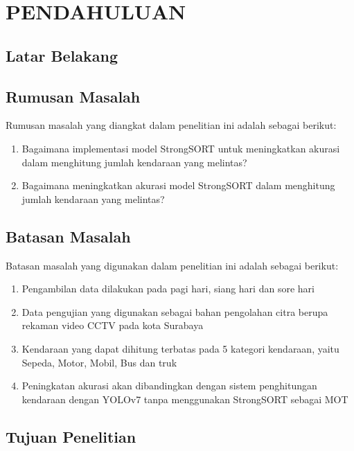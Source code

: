 \chapter{PENDAHULUAN}
\section{Latar Belakang}

\lipsum[2-4]

\section{Rumusan Masalah}

Rumusan masalah yang diangkat dalam penelitian ini adalah sebagai berikut: 
\begin{enumerate}
  \item Bagaimana implementasi model StrongSORT untuk meningkatkan akurasi dalam menghitung jumlah kendaraan yang melintas?
  \item Bagaimana meningkatkan akurasi model StrongSORT dalam menghitung jumlah kendaraan yang melintas?
\end{enumerate}

\section{Batasan Masalah}

Batasan masalah yang digunakan dalam penelitian ini adalah sebagai berikut: \begin{enumerate}
  \item Pengambilan data dilakukan pada pagi hari, siang hari dan sore hari
  \item Data pengujian yang digunakan sebagai bahan pengolahan citra berupa rekaman video CCTV pada kota Surabaya
  \item Kendaraan yang dapat dihitung terbatas pada 5 kategori kendaraan, yaitu Sepeda, Motor, Mobil, Bus dan truk
  \item Peningkatan akurasi akan dibandingkan dengan sistem penghitungan kendaraan dengan YOLOv7 tanpa menggunakan StrongSORT sebagai MOT
\end{enumerate}

\section{Tujuan Penelitian}


